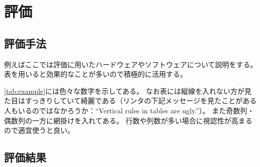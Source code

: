 \chapter{評価}\label{ch:evaluation}

\section{評価手法}\label{sec:methodology}

例えばここでは評価に用いたハードウェアやソフトウェアについて説明をする。
表を用いると効果的なことが多いので積極的に活用する。

\begin{table}[ht]
  \caption{数字が色々書いてある表}{
  \centering
}
\end{table}

\cref{tab:example}には色々な数字を示してある。
なお表には縦線を入れない方が見た目はすっきりしていて綺麗である（リンタの下記メッセージを見たことがある人もいるのではなかろうか：``Vertical rules in tables are ugly.''）。
また奇数列・偶数列の一方に網掛けを入れてある。
行数や列数が多い場合に視認性が高まるので適宜使うと良い。

\section{評価結果}\label{sec:results}

